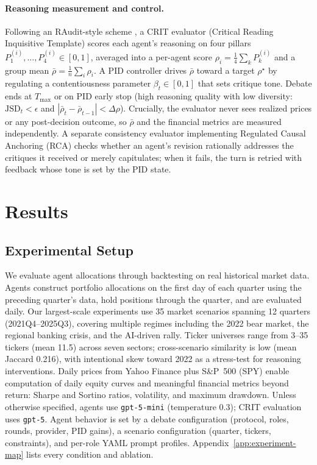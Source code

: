 \documentclass{article}
\begin{document}
\vspace{-4pt}
\paragraph{Reasoning measurement and control.}
Following an RAudit-style scheme \citep{raudit}, a CRIT evaluator (Critical Reading Inquisitive Template) \citep{chang2023promptinglargelanguagemodels} scores each agent's reasoning on four
pillars $P_1^{(i)},\dots,P_4^{(i)}\in[0,1]$, averaged into a per-agent score
$\rho_i=\tfrac14\sum_k P_k^{(i)}$ and a group mean
$\bar{\rho}=\tfrac1n\sum_i \rho_i$. A PID controller drives $\bar{\rho}$ toward a target
$\rho^\star$ by regulating a contentiousness parameter $\beta_t\in[0,1]$ that sets
critique tone. Debate ends at $T_{\max}$ or on PID early stop (high reasoning quality
with low diversity: $\mathrm{JSD}_t<\epsilon$ and
$|\bar{\rho}_t-\bar{\rho}_{t-1}|<\Delta\rho$). Crucially, the evaluator never sees
realized prices or any post-decision outcome, so $\bar{\rho}$ and the financial metrics
are measured independently. A separate consistency evaluator implementing Regulated Causal Anchoring (RCA) \citep{rca} checks whether an agent's revision rationally addresses the critiques it
received or merely capitulates; when it fails, the turn is retried with feedback whose
tone is set by the PID state.


 \section{Results}
\vspace{-0.15cm}
\subsection{Experimental Setup}
\vspace{-0.15cm}
We evaluate agent allocations through backtesting on real historical market data. Agents construct portfolio allocations on the first day of each quarter using the preceding quarter's data, hold positions through the quarter, and are evaluated daily. Our largest-scale experiments use 35 market scenarios spanning 12 quarters (2021Q4--2025Q3), covering multiple regimes including the 2022 bear market, the regional banking crisis, and the AI-driven rally. Ticker universes range from 3--35 tickers (mean 11.5) across seven sectors; cross-scenario similarity is low (mean Jaccard 0.216), with intentional skew toward 2022 as a stress-test for reasoning interventions. Daily prices from Yahoo Finance plus S\&P~500 (SPY) enable computation of daily equity curves and meaningful financial metrics beyond return: Sharpe and Sortino ratios, volatility, and maximum drawdown. Unless otherwise specified, agents use \texttt{gpt-5-mini} (temperature 0.3); CRIT evaluation uses \texttt{gpt-5}. Agent behavior is set by a debate configuration (protocol, roles, rounds, provider, PID gains), a scenario configuration (quarter, tickers, constraints), and per-role YAML prompt profiles. Appendix~\ref{app:experiment-map} lists every condition and ablation.
\end{document}
